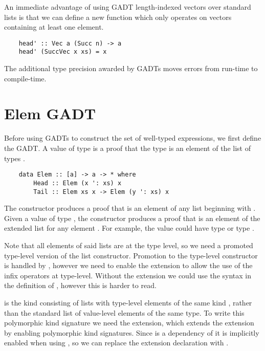 An immediate advantage of using GADT length-indexed vectors over standard lists is that we can define a new function  which only operates on vectors containing at least one element. 

\begin{lstlisting}
    head' :: Vec a (Succ n) -> a
    head' (SuccVec x xs) = x
\end{lstlisting}

The additional type precision awarded by GADTs moves errors from run-time to compile-time.


\section{Elem GADT}

Before using GADTs to construct the set of well-typed expressions, we first define the  GADT. A value of type  is a proof that the type  is an element of the list of types . 

\begin{lstlisting}
    data Elem :: [a] -> a -> * where
        Head :: Elem (x ': xs) x
        Tail :: Elem xs x -> Elem (y ': xs) x
\end{lstlisting}
\cite{GADTs}

The  constructor produces a proof that  is an element of any list beginning with . Given a value of type , the  constructor produces a proof that  is an element of the extended list  for any element . For example, the value  could have type  or type . 

Note that all elements of said lists are at the type level, so we need a promoted type-level version of the \code{(:)} list constructor. Promotion to the type-level constructor  is handled by , however we need to enable the  extension to allow the use of the infix operators at type-level. Without the  extension we could use the syntax  in the definition of , however this is harder to read.

\code{[a]} is the kind consisting of lists with type-level elements of the same kind , rather than the standard list of value-level elements of the same type. To write this polymorphic kind signature we need the  extension, which extends the  extension by enabling polymorphic kind signatures. Since  is a dependency of  it is implicitly enabled when using , so we can replace the  extension declaration with .


